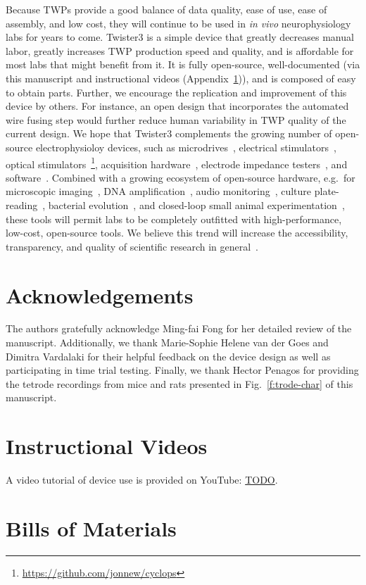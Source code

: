 \documentclass[11pt,a4paper]{article}
\begin{document}
Because TWPs provide a good balance of data quality, ease of use, ease of
assembly, and low cost, they will continue to be used in \textit{in vivo}
neurophysiology labs for years to come. Twister3 is a simple device that
greatly decreases manual labor, greatly increases TWP production speed and
quality, and is affordable for most labs that might benefit from it. It is
fully open-source, well-documented (via this manuscript and instructional
videos (Appendix~\ref{s:videos})), and is composed of easy to obtain parts.
Further, we encourage the replication and improvement of this device by others.
For instance, an open design that incorporates the automated wire fusing step
would further reduce human variability in TWP quality of the current design. We
hope that Twister3 complements the growing number of open-source
electrophysioloy devices, such as
microdrives~\cite{Kloosterman2009,Voigts2013}, electrical
stimulators~\cite{Cermak2019}, optical
stimulators~\cite{Newman2015}\footnote{\url{https://github.com/jonnew/cyclops}},
acquisition hardware~\cite{Siegle2017}, electrode impedance
testers~\cite{Matsumoto2019}, and software~\cite{Newman2012b, Siegle2017,
Lopes2015}. Combined with a growing ecosystem of open-source hardware, e.g.\
for microscopic imaging~\cite{Cai2016,Voigt2019,MIMMS}, DNA
amplification~\cite{OpenPCR}, audio monitoring~\cite{Hill2018}, culture
plate-reading~\cite{Szymula2019}, bacterial evolution~\cite{Takahashi2015}, and
closed-loop small animal experimentation~\cite{Maia2017,Moreira2019}, these
tools will permit labs to be completely outfitted with high-performance,
low-cost, open-source tools. We believe this trend will increase the
accessibility, transparency, and quality of scientific research in
general~\cite{Siegle2015}.

\section*{Acknowledgements}
The authors gratefully acknowledge Ming-fai Fong for her detailed review of the
manuscript. Additionally, we thank Marie-Sophie Helene van der Goes and Dimitra
Vardalaki for their helpful feedback on the device design as well as
participating in time trial testing. Finally, we thank Hector Penagos for
providing the tetrode recordings from mice and rats presented in
Fig.~\ref{f:trode-char} of this manuscript.

\medskip




\newpage

\begin{appendices}

\section{Instructional Videos}\label{s:videos}

A video tutorial of device use is provided on YouTube: \url{TODO}.

\section{Bills of Materials}\label{s:boms}





\end{appendices}
\end{document}

